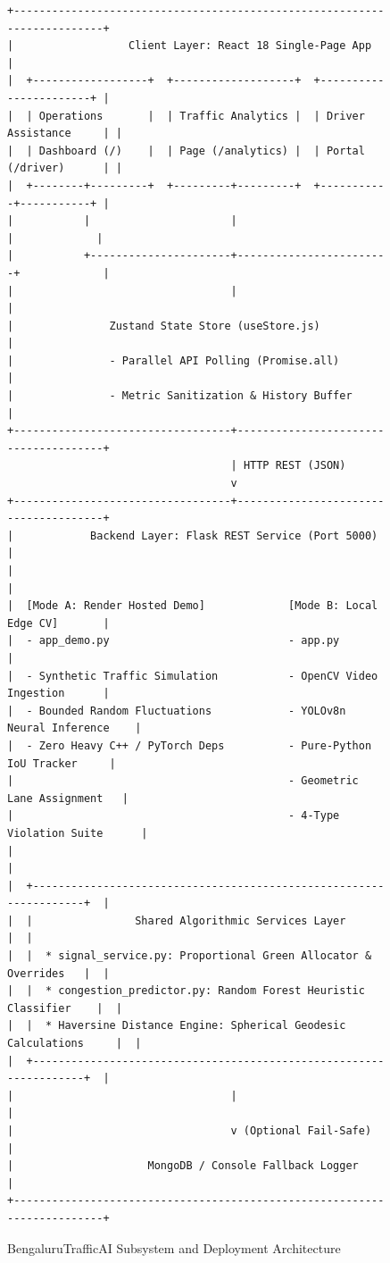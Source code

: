 \begin{figure}[h!]
\centering
\small
\begin{tcolorbox}[colback=white,colframe=branddark,arc=2mm,title=\textbf{High-Level Architecture Schematic}]
\begin{verbatim}
+-------------------------------------------------------------------------+
|                  Client Layer: React 18 Single-Page App                 |
|  +------------------+  +-------------------+  +-----------------------+ |
|  | Operations       |  | Traffic Analytics |  | Driver Assistance     | |
|  | Dashboard (/)    |  | Page (/analytics) |  | Portal (/driver)      | |
|  +--------+---------+  +---------+---------+  +-----------+-----------+ |
|           |                      |                        |             |
|           +----------------------+------------------------+             |
|                                  |                                      |
|               Zustand State Store (useStore.js)                         |
|               - Parallel API Polling (Promise.all)                      |
|               - Metric Sanitization & History Buffer                    |
+----------------------------------+--------------------------------------+
                                   | HTTP REST (JSON)
                                   v
+----------------------------------+--------------------------------------+
|            Backend Layer: Flask REST Service (Port 5000)                |
|                                                                         |
|  [Mode A: Render Hosted Demo]             [Mode B: Local Edge CV]       |
|  - app_demo.py                            - app.py                      |
|  - Synthetic Traffic Simulation           - OpenCV Video Ingestion      |
|  - Bounded Random Fluctuations            - YOLOv8n Neural Inference    |
|  - Zero Heavy C++ / PyTorch Deps          - Pure-Python IoU Tracker     |
|                                           - Geometric Lane Assignment   |
|                                           - 4-Type Violation Suite      |
|                                                                         |
|  +-------------------------------------------------------------------+  |
|  |                Shared Algorithmic Services Layer                  |  |
|  |  * signal_service.py: Proportional Green Allocator & Overrides   |  |
|  |  * congestion_predictor.py: Random Forest Heuristic Classifier    |  |
|  |  * Haversine Distance Engine: Spherical Geodesic Calculations     |  |
|  +-------------------------------------------------------------------+  |
|                                  |                                      |
|                                  v (Optional Fail-Safe)                 |
|                     MongoDB / Console Fallback Logger                   |
+-------------------------------------------------------------------------+
\end{verbatim}
\end{tcolorbox}
\caption{BengaluruTrafficAI Subsystem and Deployment Architecture}
\label{fig:arch_diagram}
\end{figure}

